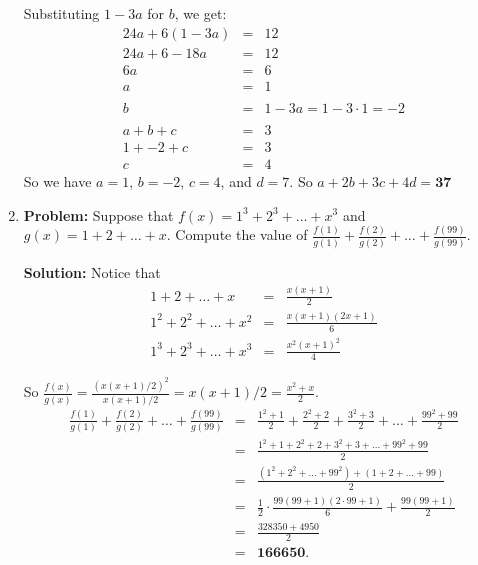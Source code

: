 \documentclass{article}
\begin{document}
\begin{enumerate}
Substituting $1 - 3a$ for $b$, we get:
\begin{eqnarray*}
24a + 6(1 - 3a) &=& 12 \\
24a + 6 - 18a &=& 12 \\
6a &=& 6 \\
a &=& 1 \\ \\
b &=& 1 - 3a = 1-3 \cdot 1 = -2 \\ \\
a + b + c &=& 3 \\
1 + -2 + c &=& 3 \\
c &=& 4
\end{eqnarray*}
So we have $a = 1$, $b = -2$, $c = 4$, and $d = 7$.  So $a + 2b + 3c + 4d = \textbf{37}$


\item \textbf{Problem:} Suppose that $f(x) = 1^3 + 2^3 + \ldots + x^3$ and $g(x) = 1 + 2 + \ldots + x$.  Compute the value of $\displaystyle \frac{f(1)}{g(1)} + \frac{f(2)}{g(2)} + \ldots + \frac{f(99)}{g(99)}$.

\textbf{Solution:} Notice that
\begin{eqnarray*}
\displaystyle 1 + 2 + \ldots + x &=& \frac{x(x+1)}{2} \\
1^2 + 2^2 + \ldots + x^2 &=& \frac{x(x+1)(2x+1)}{6} \\
1^3 + 2^3 + \ldots + x^3 &=& \frac{x^2 (x+1)^2}{4}
\end{eqnarray*}

So $\displaystyle \frac{f(x)}{g(x)} = \frac{(x(x+1)/2)^2}{x(x+1)/2} = x(x+1)/2 = \frac{x^2 + x}{2}$. \\

\begin{eqnarray*}
\displaystyle \frac{f(1)}{g(1)} + \frac{f(2)}{g(2)} + \ldots + \frac{f(99)}{g(99)} &=& \frac{1^2 + 1}{2} + \frac{2^2 + 2}{2} + \frac{3^2 + 3}{2} + \ldots + \frac{99^2 + 99}{2} \\
&=& \frac{1^2 + 1 + 2^2 + 2 + 3^2 + 3 + \ldots + 99^2 + 99}{2}  \\
&=& \frac{(1^2 + 2^2 + ... + 99^2) + (1 + 2 + ... + 99)}{2}  \\
&=& \frac{1}{2} \cdot {\frac{99(99+1)(2 \cdot 99+1)}{6} + \frac{99(99+1)}{2}} \\
&=& \frac{328350 + 4950}{2} \\
&=& \mathbf{166650}.
\end{eqnarray*}

\end{enumerate}
\end{document}
